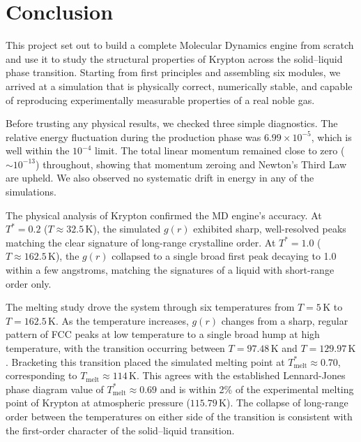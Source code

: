 
\newpage
\section{Conclusion}

This project set out to build a complete Molecular Dynamics engine from scratch and use it to
study the structural properties of Krypton across the solid--liquid phase transition. Starting
from first principles and assembling six modules, we arrived at a simulation that
is physically correct, numerically stable, and capable of reproducing experimentally measurable
properties of a real noble gas.

Before trusting any physical results, we checked three simple diagnostics. The relative energy fluctuation during the production phase was $6.99 \times 10^{-5}$, which is well within the $10^{-4}$ limit. The total linear momentum remained close to zero ($\sim 10^{-13}$) throughout, showing that momentum zeroing and Newton’s Third Law are upheld. We also observed no systematic drift in energy in any of the simulations.

The physical analysis of Krypton confirmed the MD engine's accuracy. At $T^* = 0.2$
($T \approx 32.5\,\text{K}$), the simulated $g(r)$ exhibited sharp, well-resolved peaks
matching the clear
signature of long-range crystalline order. At $T^* = 1.0$ ($T \approx 162.5\,\text{K}$),
the $g(r)$ collapsed to a single broad first peak decaying to 1.0 within a few angstroms,
matching the signatures of a liquid with short-range order only.

The melting study drove the system through six temperatures from $T = 5\,\text{K}$ to
$T = 162.5\,\text{K}$. As the temperature increases, $g(r)$ changes from a sharp, regular pattern of FCC peaks at low temperature to a single broad hump at high temperature, with the transition occurring between $T = 97.48\,\text{K}$ and $T = 129.97\,\text{K}$. Bracketing
this transition placed the simulated melting point at $T^*_\text{melt} \approx 0.70$,
corresponding to $T_\text{melt} \approx 114\,\text{K}$. This agrees with the established
Lennard-Jones phase diagram value of $T^*_\text{melt} \approx 0.69$ and is within 2\% of the
experimental melting point of Krypton at atmospheric pressure ($115.79\,\text{K}$). The collapse of long-range order between the temperatures on either side of the transition is consistent with the first-order character of the solid–liquid transition.

